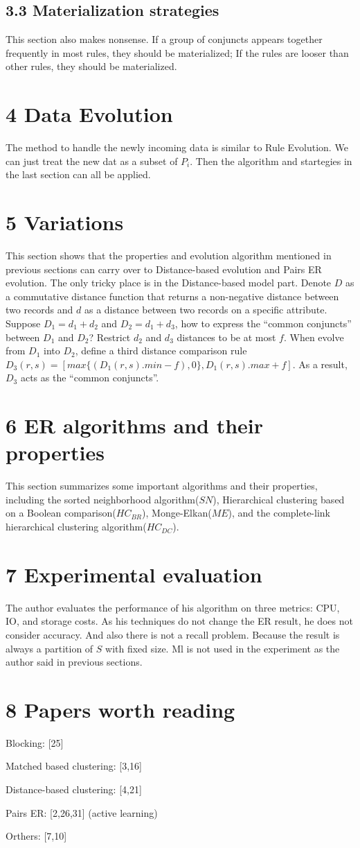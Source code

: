 \documentclass[12pt,a4paper]{report}
\begin{document}
\subsection*{3.3 Materialization strategies}
This section also makes nonsense. If a group of conjuncts appears together frequently in most rules, they should be materialized; If the rules are looser than other rules, they should be materialized.

\section*{4 Data Evolution}
The method to handle the newly incoming data is similar to Rule Evolution. We can just treat the new dat as a subset of $P_{i}$. Then the algorithm and startegies in the last section can all be applied.

\section*{5 Variations}
This section shows that the properties and evolution algorithm mentioned in previous sections can carry over to Distance-based evolution and Pairs ER evolution. The only tricky place is in the Distance-based model part. Denote $D$ as a commutative distance function that returns a non-negative distance between two records and $d$ as a distance between two records on a specific attribute. Suppose $D_{1}=d_{1}+d_{2}$ and  $D_{2}=d_{1}+d_{3}$, how to express the ``common conjuncts'' between $D_{1}$ and $D_{2}$? Restrict $d_{2}$ and $d_{3}$ distances to be at most $f$. When evolve from $D_{1}$ into $D_{2}$, define a third distance comparison rule $D_{3}(r,s)=[max\{(D_{1}(r,s).min-f),0\}, D_{1}(r,s).max+f]$. As a result, $D_{3}$ acts as the ``common conjuncts''.

\section*{6 ER algorithms and their properties}
This section summarizes some important algorithms and their properties, including the sorted neighborhood algorithm(\textbf{$SN$}), Hierarchical clustering based on a Boolean comparison(\textbf{$HC_{BR}$}), Monge-Elkan(\textbf{$ME$}), and the complete-link hierarchical clustering algorithm(\textbf{$HC_{DC}$}).

\section*{7 Experimental evaluation}
The author evaluates the performance of his algorithm on three metrics: CPU, IO, and storage costs. As his techniques do not change the ER result, he does not consider accuracy. And also there is not a recall problem. Because the result is always a partition of $S$ with fixed size. Ml is not used in the experiment as the author said in previous sections.

 \section*{8 Papers worth reading}
Blocking: [25]

\noindent Matched based clustering: [3,16]

\noindent Distance-based clustering: [4,21]

\noindent Pairs ER: [2,26,31] (active learning)

\noindent Orthers: [7,10]
\end{document}
